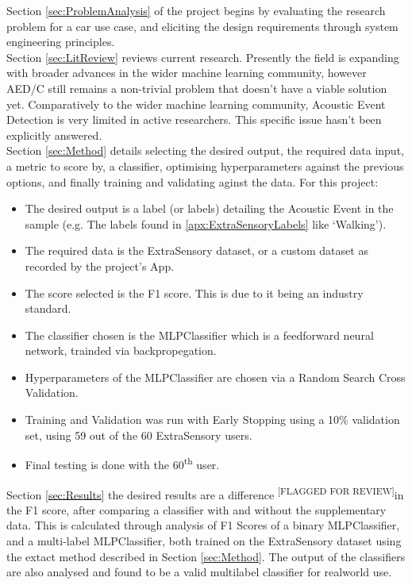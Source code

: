 \documentclass{UoNMCHA}
\newcommand{\flagforreview}{\textsuperscript{\color{red} [FLAGGED FOR REVIEW]}}
\numberwithin{equation}{section}
\begin{document}
Section \ref{sec:ProblemAnalysis} of the project begins by evaluating the research problem for a car use case, and eliciting the design requirements through system engineering principles. \\

Section \ref{sec:LitReview} reviews current research. Presently the field is expanding with broader advances in the wider machine learning community, however AED/C still remains a non-trivial problem that doesn't have a viable solution yet. Comparatively to the wider machine learning community, Acoustic Event Detection is very limited in active researchers. This specific issue hasn't been explicitly answered. \\

Section \ref{sec:Method} details selecting the desired output, the required data input, a metric to score by, a classifier, optimising hyperparameters against the previous options, and finally training and validating aginst the data. For this project:
{\small
\begin{itemize}
    \item The desired output is a label (or labels) detailing the Acoustic Event in the sample (e.g. The labels found in \ref{apx:ExtraSensoryLabels} like `Walking').
    \item The required data is the ExtraSensory dataset, or a custom dataset as recorded by the project's App.
    \item The score selected is the F1 score. This is due to it being an industry standard.
    \item The classifier chosen is the MLPClassifier which is a feedforward neural network, trainded via backpropegation.
    \item Hyperparameters of the MLPClassifier are chosen via a Random Search Cross Validation.
    \item Training and Validation was run with Early Stopping using a 10\% validation set, using 59 out of the 60 ExtraSensory users.
    \item Final testing is done with the 60\textsuperscript{th} user.
\end{itemize}
}
Section \ref{sec:Results} the desired results are a  difference \flagforreview in the F1 score, after comparing a classifier with and without the supplementary data. This is calculated through analysis of F1 Scores of a binary MLPClassifier, and a multi-label MLPClassifier, both trained on the ExtraSensory dataset using the extact method described in Section \ref{sec:Method}. The output of the classifiers are also analysed and found to be a valid multilabel classifier for realworld use.
\end{document}
